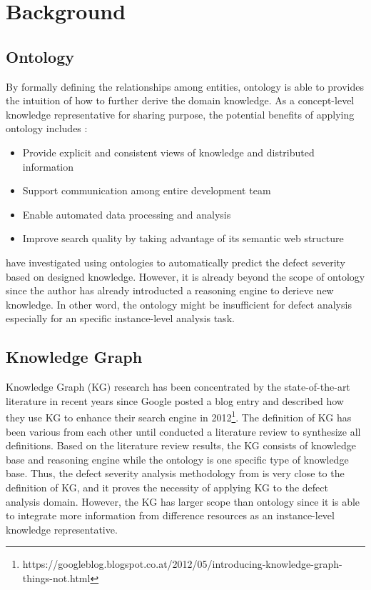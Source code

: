 \documentclass[12pt] {article}
\begin{document}
\section{Background}
\subsection{Ontology}
By formally defining the relationships among entities, ontology is able to provides the intuition of how to further derive the domain knowledge.
As a concept-level knowledge representative for sharing purpose, the potential benefits of applying ontology includes \cite{christina2016an}:
\begin{itemize}
    \item Provide explicit and consistent views of knowledge and distributed information
    \item Support communication among entire development team 
    \item Enable automated data processing and analysis
    \item Improve search quality by taking advantage of its semantic web structure
\end{itemize}
 have investigated using ontologies to automatically predict the defect severity based on designed knowledge.
However, it is already beyond the scope of ontology since the author has already introducted a reasoning engine to derieve new knowledge.  
In other word, the ontology might be insufficient for defect analysis especially for an specific instance-level analysis task. 

\subsection{Knowledge Graph}
Knowledge Graph (KG) research has been concentrated by the state-of-the-art literature in recent years since Google posted a blog entry and described how they use KG to enhance their search engine in 2012\footnote{https://googleblog.blogspot.co.at/2012/05/introducing-knowledge-graph-things-not.html}.
The definition of KG has been various from each other until  conducted a literature review to synthesize all definitions.
Based on the literature review results, the KG consists of knowledge base and reasoning engine while the ontology is one specific type of knowledge base.
Thus, the defect severity analysis methodology from  is very close to the definition of KG, and it proves the necessity of applying KG to the defect analysis domain. 
However, the KG has larger scope than ontology since it is able to integrate more information from difference resources as an instance-level knowledge representative. 
\end{document}
